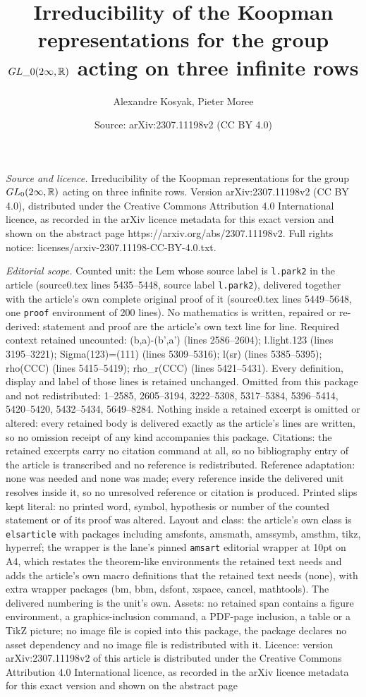 \documentclass[10pt,a4paper]{amsart}
\title[Irreducibility of the Koopman representations for the group ]{Irreducibility of the Koopman representations for the group ${\rm GL}\_0(2\infty,{\mathbb R})$ acting on three infinite rows}
\author{Alexandre Kosyak, Pieter Moree}
\date{Source: arXiv:2307.11198v2 (CC BY 4.0)}
\begin{document}
\maketitle

\noindent\emph{Source and licence.} Irreducibility of the Koopman representations for the group ${\rm GL}_0(2\infty,{\mathbb R})$ acting on three infinite rows. Version arXiv:2307.11198v2 (CC BY 4.0), distributed under the Creative Commons Attribution 4.0 International licence, as recorded in the arXiv licence metadata for this exact version and shown on the abstract page https://arxiv.org/abs/2307.11198v2. Full rights notice: licenses/arxiv-2307.11198-CC-BY-4.0.txt.\par\smallskip

\noindent\textit{Editorial scope.} Counted unit: the Lem whose source label is \texttt{l.park2} in the article (source0.tex lines 5435--5448, source label \texttt{l.park2}), delivered together with the article's own complete original proof of it (source0.tex lines 5449--5648, one \texttt{proof} environment of 200 lines). No mathematics is written, repaired or re-derived: statement and proof are the article's own text line for line. Required context retained uncounted: (b,a)-(b',a') (lines 2586--2604); l.light.123 (lines 3195--3221); Sigma(123)=(111) (lines 5309--5316); l(sr) (lines 5385--5395); rho(CCC) (lines 5415--5419); rho\_r(CCC) (lines 5421--5431). Every definition, display and label of those lines is retained unchanged. Omitted from this package and not redistributed: 1--2585, 2605--3194, 3222--5308, 5317--5384, 5396--5414, 5420--5420, 5432--5434, 5649--8284. Nothing inside a retained excerpt is omitted or altered: every retained body is delivered exactly as the article's lines are written, so no omission receipt of any kind accompanies this package. Citations: the retained excerpts carry no citation command at all, so no bibliography entry of the article is transcribed and no reference is redistributed. Reference adaptation: none was needed and none was made; every reference inside the delivered unit resolves inside it, so no unresolved reference or citation is produced. Printed slips kept literal: no printed word, symbol, hypothesis or number of the counted statement or of its proof was altered. Layout and class: the article's own class is \texttt{elsarticle} with packages including amsfonts, amsmath, amssymb, amsthm, tikz, hyperref; the wrapper is the lane's pinned \texttt{amsart} editorial wrapper at 10pt on A4, which restates the theorem-like environments the retained text needs and adds the article's own macro definitions that the retained text needs (none), with extra wrapper packages (bm, bbm, dsfont, xspace, cancel, mathtools). The delivered numbering is the unit's own. Assets: no retained span contains a figure environment, a graphics-inclusion command, a PDF-page inclusion, a table or a TikZ picture; no image file is copied into this package, the package declares no asset dependency and no image file is redistributed with it. Licence: version arXiv:2307.11198v2 of this article is distributed under the Creative Commons Attribution 4.0 International licence, as recorded in the arXiv licence metadata for this exact version and shown on the abstract page 
\end{document}

